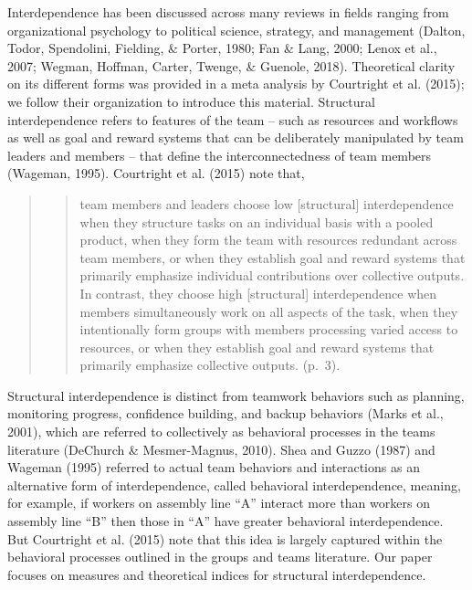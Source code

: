 \documentclass[english,,man]{apa6}
\theoremstyle{definition}
\theoremstyle{definition}
\theoremstyle{definition}
\theoremstyle{remark}
\begin{document}
Interdependence has been discussed across many reviews in fields ranging
from organizational psychology to political science, strategy, and
management (Dalton, Todor, Spendolini, Fielding, \& Porter, 1980; Fan \&
Lang, 2000; Lenox et al., 2007; Wegman, Hoffman, Carter, Twenge, \&
Guenole, 2018). Theoretical clarity on its different forms was provided
in a meta analysis by Courtright et al. (2015); we follow their
organization to introduce this material. Structural interdependence
refers to features of the team -- such as resources and workflows as
well as goal and reward systems that can be deliberately manipulated by
team leaders and members -- that define the interconnectedness of team
members (Wageman, 1995). Courtright et al. (2015) note that,

\begin{quote}
\begin{quote}
team members and leaders choose low {[}structural{]} interdependence
when they structure tasks on an individual basis with a pooled product,
when they form the team with resources redundant across team members, or
when they establish goal and reward systems that primarily emphasize
individual contributions over collective outputs. In contrast, they
choose high {[}structural{]} interdependence when members simultaneously
work on all aspects of the task, when they intentionally form groups
with members processing varied access to resources, or when they
establish goal and reward systems that primarily emphasize collective
outputs. (p.~3).
\end{quote}
\end{quote}

Structural interdependence is distinct from teamwork behaviors such as
planning, monitoring progress, confidence building, and backup behaviors
(Marks et al., 2001), which are referred to collectively as behavioral
processes in the teams literature (DeChurch \& Mesmer-Magnus, 2010).
Shea and Guzzo (1987) and Wageman (1995) referred to actual team
behaviors and interactions as an alternative form of interdependence,
called behavioral interdependence, meaning, for example, if workers on
assembly line \enquote{A} interact more than workers on assembly line
\enquote{B} then those in \enquote{A} have greater behavioral
interdependence. But Courtright et al. (2015) note that this idea is
largely captured within the behavioral processes outlined in the groups
and teams literature. Our paper focuses on measures and theoretical
indices for structural interdependence.
\end{document}
